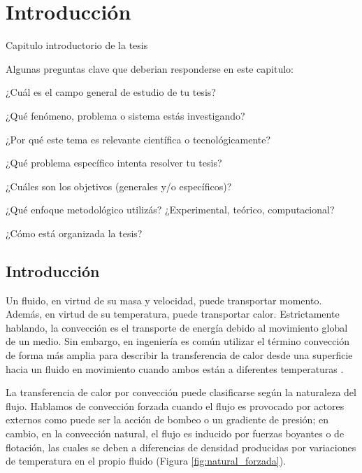 \chapter{Introducción}
\label{intro}

Capitulo introductorio de la tesis


Algunas preguntas clave que deberian responderse en este capitulo:

¿Cuál es el campo general de estudio de tu tesis?

¿Qué fenómeno, problema o sistema estás investigando?

¿Por qué este tema es relevante científica o tecnológicamente?

¿Qué problema específico intenta resolver tu tesis?

¿Cuáles son los objetivos (generales y/o específicos)?

¿Qué enfoque metodológico utilizás? ¿Experimental, teórico, computacional?

¿Cómo está organizada la tesis?

\newpage
\section{Introducción}

Un fluido, en virtud de su masa y velocidad, puede transportar momento. Además, en virtud de su temperatura, puede transportar calor. Estrictamente hablando, la convección es el transporte de energía debido al movimiento global de un medio. Sin embargo, en ingeniería es común utilizar el término convección de forma más amplia para describir la transferencia de calor desde una superficie hacia un fluido en movimiento cuando ambos están a diferentes temperaturas \cite{cengelheat,incropera}. 

La transferencia de calor por convección puede clasificarse según la naturaleza del flujo. Hablamos de convección forzada cuando el flujo es provocado por actores externos como puede ser la acción de bombeo o un gradiente de presión; en cambio, en la convección natural, el flujo es inducido por fuerzas boyantes o de flotación, las cuales se deben a diferencias de densidad producidas por variaciones de temperatura en el propio fluido (Figura \ref{fig:natural_forzada}).

